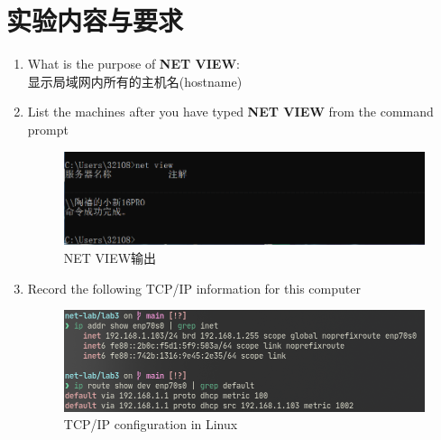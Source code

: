 \documentclass[a4paper]{ctexart}
\begin{document}
  \section{实验内容与要求}
    \begin{enumerate}
      \item What is the purpose of \textbf{NET VIEW}:\\
      显示局域网内所有的主机名(hostname)

      \item List the machines after you have typed \textbf{NET VIEW} from the command prompt
      \begin{figure}[H]
        \includegraphics*[width=1.0\textwidth]{fig/NETVIEW.png}
        \caption{NET VIEW输出}
      \end{figure}

      \item Record the following TCP/IP information for this computer
      \begin{figure}[H]
        \includegraphics*[width=1.0\textwidth]{fig/ip.png}
        \caption[]{TCP/IP configuration in Linux}
      \end{figure}
       \underline{}\\
       \underline{}\\
       \underline{}


\end{enumerate}
\end{document}
